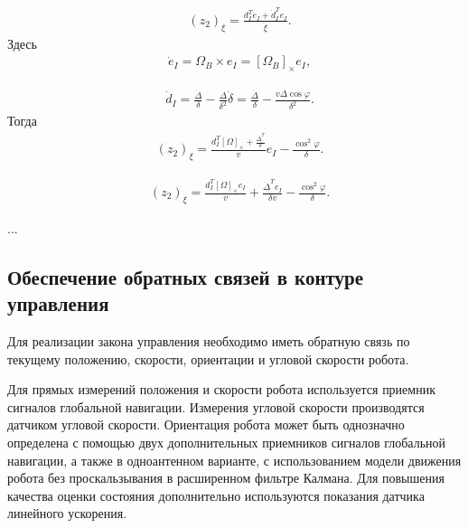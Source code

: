 \documentclass[a4paper,12pt]{article}
\begin{document}
\begin{align}  \label{eq:z2_dxi}
&(z_2)_{\xi} = \frac{d_I^T \dot e_I + \dot d_I^T  e_I}{\dot \xi}.
\end{align}
Здесь
\begin{align}  \label{eq:e_I_dot}
&\dot e_I = \Omega_{B} \times e_I = [\Omega_{B}]_{\times} e_I,
\end{align}

\begin{align}  \label{eq:d_I_dot}
&\dot d_I = \frac{\dot \Delta}{\delta} - \frac{\Delta }{\delta^2} \dot \delta = \frac{\dot \Delta}{\delta} - \frac{v \Delta \cos \varphi}{\delta^2}.
\end{align}
Тогда
\begin{align}  \label{eq:z2_dxi_2}
&(z_2)_{\xi} =\frac
{d_I^T [\Omega]_{\times} + \frac{\dot \Delta^T}{\delta}}
{v} e_I -
\frac{\cos^2 \varphi }{\delta}
.
\end{align}

\begin{align}  \label{eq:z2_dxi_3}
&(z_2)_{\xi} =
\frac{d_I^T [\Omega]_{\times} e_I}{v} +
\frac{\dot \Delta^T e_I}{\delta v} -
\frac{\cos^2 \varphi }{\delta}
.
\end{align}

...

\subsection{Обеспечение обратных связей в контуре управления}
Для реализации закона управления необходимо иметь обратную связь по текущему положению, скорости, ориентации и угловой скорости робота.

Для прямых измерений положения и скорости робота используется приемник сигналов глобальной навигации. Измерения угловой скорости производятся датчиком угловой скорости. Ориентация робота может быть однозначно определена с помощью двух дополнительных приемников сигналов глобальной навигации, а также в одноантенном варианте, с использованием модели движения робота без проскальзывания в расширенном фильтре Калмана. Для повышения качества оценки состояния дополнительно используются показания датчика линейного ускорения.
\end{document}
